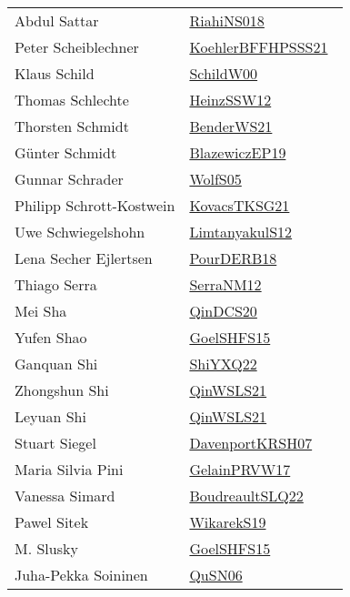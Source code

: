 {\begin{longtable}{p{4cm}p{20cm}}
Abdul Sattar & \href{papers/RiahiNS018.pdf}{RiahiNS018}~\cite{RiahiNS018}\\
Peter Scheiblechner & \href{articles/KoehlerBFFHPSSS21.pdf}{KoehlerBFFHPSSS21}~\cite{KoehlerBFFHPSSS21}\\
Klaus Schild & \href{articles/SchildW00.pdf}{SchildW00}~\cite{SchildW00}\\
Thomas Schlechte & \href{articles/HeinzSSW12.pdf}{HeinzSSW12}~\cite{HeinzSSW12}\\
Thorsten Schmidt & \href{papers/BenderWS21.pdf}{BenderWS21}~\cite{BenderWS21}\\
Günter Schmidt & \href{}{BlazewiczEP19}~\cite{BlazewiczEP19}\\
Gunnar Schrader & \href{papers/WolfS05.pdf}{WolfS05}~\cite{WolfS05}\\
Philipp Schrott{-}Kostwein & \href{papers/KovacsTKSG21.pdf}{KovacsTKSG21}~\cite{KovacsTKSG21}\\
Uwe Schwiegelshohn & \href{articles/LimtanyakulS12.pdf}{LimtanyakulS12}~\cite{LimtanyakulS12}\\
Lena Secher Ejlertsen & \href{articles/PourDERB18.pdf}{PourDERB18}~\cite{PourDERB18}\\
Thiago Serra & \href{papers/SerraNM12.pdf}{SerraNM12}~\cite{SerraNM12}\\
Mei Sha & \href{articles/QinDCS20.pdf}{QinDCS20}~\cite{QinDCS20}\\
Yufen Shao & \href{articles/GoelSHFS15.pdf}{GoelSHFS15}~\cite{GoelSHFS15}\\
Ganquan Shi & \href{}{ShiYXQ22}~\cite{ShiYXQ22}\\
Zhongshun Shi & \href{articles/QinWSLS21.pdf}{QinWSLS21}~\cite{QinWSLS21}\\
Leyuan Shi & \href{articles/QinWSLS21.pdf}{QinWSLS21}~\cite{QinWSLS21}\\
Stuart Siegel & \href{papers/DavenportKRSH07.pdf}{DavenportKRSH07}~\cite{DavenportKRSH07}\\
Maria Silvia Pini & \href{papers/GelainPRVW17.pdf}{GelainPRVW17}~\cite{GelainPRVW17}\\
Vanessa Simard & \href{papers/BoudreaultSLQ22.pdf}{BoudreaultSLQ22}~\cite{BoudreaultSLQ22}\\
Pawel Sitek & \href{articles/WikarekS19.pdf}{WikarekS19}~\cite{WikarekS19}\\
M. Slusky & \href{articles/GoelSHFS15.pdf}{GoelSHFS15}~\cite{GoelSHFS15}\\
Juha{-}Pekka Soininen & \href{papers/QuSN06.pdf}{QuSN06}~\cite{QuSN06}\\

\end{longtable}}
